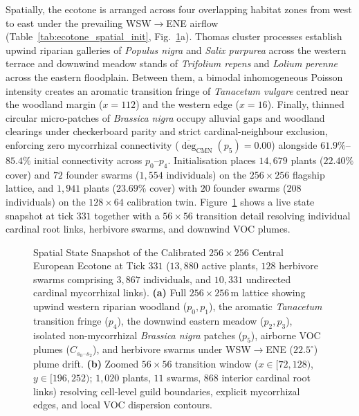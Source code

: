 Spatially, the ecotone is arranged across four overlapping habitat zones from west to east under the prevailing WSW$\to$ENE airflow (Table~\ref{tab:ecotone_spatial_init}, Fig.~\ref{fig:ecotone_spatial_snapshot}a). Thomas cluster processes establish upwind riparian galleries of \textit{Populus nigra} and \textit{Salix purpurea} across the western terrace and downwind meadow stands of \textit{Trifolium repens} and \textit{Lolium perenne} across the eastern floodplain. Between them, a bimodal inhomogeneous Poisson intensity creates an aromatic transition fringe of \textit{Tanacetum vulgare} centred near the woodland margin ($x = 112$) and the western edge ($x = 16$). Finally, thinned circular micro-patches of \textit{Brassica nigra} occupy alluvial gaps and woodland clearings under checkerboard parity and strict cardinal-neighbour exclusion, enforcing zero mycorrhizal connectivity ($\overline{\deg}_{\text{CMN}}(p_5) = 0.00$) alongside $61.9\%$--$85.4\%$ initial connectivity across $p_0$--$p_4$. Initialisation places $14{,}679$ plants ($22.40\%$ cover) and $72$ founder swarms ($1{,}554$ individuals) on the $256 \times 256$ flagship lattice, and $1{,}941$ plants ($23.69\%$ cover) with $20$ founder swarms ($208$ individuals) on the $128 \times 64$ calibration twin. Figure~\ref{fig:ecotone_spatial_snapshot} shows a live state snapshot at tick $331$ together with a $56 \times 56$ transition detail resolving individual cardinal root links, herbivore swarms, and downwind VOC plumes.

\begin{figure}[t]
  \centering
  
  \caption{Spatial State Snapshot of the Calibrated $256 \times 256$ Central European Ecotone at Tick $331$ ($13{,}880$ active plants, $128$ herbivore swarms comprising $3{,}867$ individuals, and $10{,}331$ undirected cardinal mycorrhizal links). \textbf{(a)} Full $256 \times 256\,\mathrm{m}$ lattice showing upwind western riparian woodland ($p_0, p_1$), the aromatic \textit{Tanacetum} transition fringe ($p_4$), the downwind eastern meadow ($p_2, p_3$), isolated non-mycorrhizal \textit{Brassica nigra} patches ($p_5$), airborne VOC plumes ($C_{s_0\text{--}s_2}$), and herbivore swarms under WSW$\to$ENE ($22.5^\circ$) plume drift. \textbf{(b)} Zoomed $56 \times 56$ transition window ($x \in [72, 128)$, $y \in [196, 252)$; $1{,}020$ plants, $11$ swarms, $868$ interior cardinal root links) resolving cell-level guild boundaries, explicit mycorrhizal edges, and local VOC dispersion contours.}
  \label{fig:ecotone_spatial_snapshot}
\end{figure}

